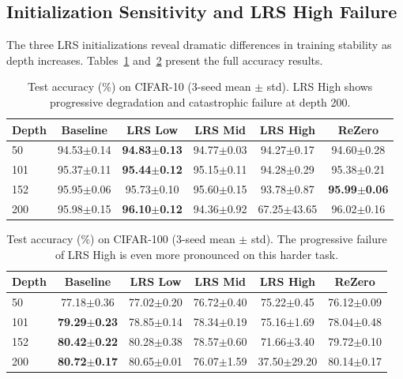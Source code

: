 \documentclass[preprint,12pt]{elsarticle}
\begin{document}
\subsection{Initialization Sensitivity and LRS High Failure}
\label{sec:init_sensitivity}

The three LRS initializations reveal dramatic differences in training stability as depth increases. Tables~\ref{tab:cifar10} and~\ref{tab:cifar100} present the full accuracy results.

\begin{table}[t]
\centering
\caption{Test accuracy (\%) on CIFAR-10 (3-seed mean $\pm$ std). LRS High shows progressive degradation and catastrophic failure at depth 200.}
\label{tab:cifar10}
\begin{tabular}{lccccc}
\toprule
\textbf{Depth} & \textbf{Baseline} & \textbf{LRS Low} & \textbf{LRS Mid} & \textbf{LRS High} & \textbf{ReZero} \\
\midrule
50  & 94.53$\pm$0.14 & \textbf{94.83$\pm$0.13} & 94.77$\pm$0.03 & 94.27$\pm$0.17 & 94.60$\pm$0.28 \\
101 & 95.37$\pm$0.11 & \textbf{95.44$\pm$0.12} & 95.15$\pm$0.11 & 94.28$\pm$0.29 & 95.38$\pm$0.21 \\
152 & 95.95$\pm$0.06 & 95.73$\pm$0.10 & 95.60$\pm$0.15 & 93.78$\pm$0.87 & \textbf{95.99$\pm$0.06} \\
200 & 95.98$\pm$0.15 & \textbf{96.10$\pm$0.12} & 94.36$\pm$0.92 & 67.25$\pm$43.65 & 96.02$\pm$0.16 \\
\bottomrule
\end{tabular}
\end{table}

\begin{table}[t]
\centering
\caption{Test accuracy (\%) on CIFAR-100 (3-seed mean $\pm$ std). The progressive failure of LRS High is even more pronounced on this harder task.}
\label{tab:cifar100}
\begin{tabular}{lccccc}
\toprule
\textbf{Depth} & \textbf{Baseline} & \textbf{LRS Low} & \textbf{LRS Mid} & \textbf{LRS High} & \textbf{ReZero} \\
\midrule
50  & 77.18$\pm$0.36 & 77.02$\pm$0.20 & 76.72$\pm$0.40 & 75.22$\pm$0.45 & 76.12$\pm$0.09 \\
101 & \textbf{79.29$\pm$0.23} & 78.85$\pm$0.14 & 78.34$\pm$0.19 & 75.16$\pm$1.69 & 78.04$\pm$0.48 \\
152 & \textbf{80.42$\pm$0.22} & 80.28$\pm$0.38 & 78.57$\pm$0.60 & 71.66$\pm$3.40 & 79.72$\pm$0.10 \\
200 & \textbf{80.72$\pm$0.17} & 80.65$\pm$0.01 & 76.07$\pm$1.59 & 37.50$\pm$29.20 & 80.14$\pm$0.17 \\
\bottomrule
\end{tabular}
\end{table}
\end{document}
